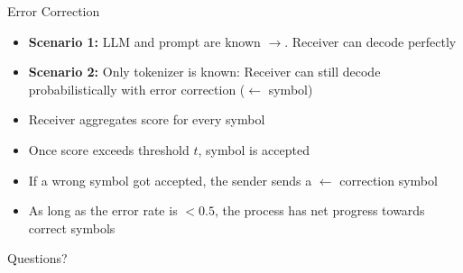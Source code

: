 \documentclass[8pt]{beamer}
\begin{document}
\begin{frame}{Error Correction}
    
    \begin{itemize}
        \item \textbf{Scenario 1:} LLM and prompt are known $\rightarrow$. Receiver can decode perfectly
        \item \textbf{Scenario 2:} Only tokenizer is known: Receiver can still decode probabilistically with error correction ($\leftarrow$ symbol)
        \item Receiver aggregates score for every symbol 
        \item Once score exceeds threshold $t$, symbol is accepted
        \item If a wrong symbol got accepted, the sender sends a $\leftarrow$ correction symbol
        \item As long as the error rate is $<0.5$, the process has net progress towards correct symbols
    \end{itemize}

    
\end{frame}

\begin{frame}
    \centering
    \Huge Questions?
\end{frame}
\end{document}
